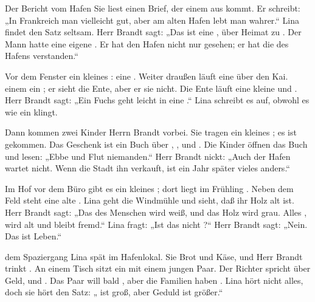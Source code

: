 \documentclass[12pt]{nextbook}
\begin{document}
\begin{readersection}{Der Bericht vom Hafen}
Sie liest einen Brief, der  einem  aus  kommt. Er schreibt: „In Frankreich  man vielleicht gut, aber am alten Hafen lebt man wahrer.“ Lina findet den Satz seltsam. Herr Brandt sagt: „Das ist eine , über Heimat zu . Der Mann hatte eine eigene . Er hat den Hafen nicht nur gesehen; er hat die  des Hafens verstanden.“

Vor dem Fenster  ein kleines : eine . Weiter draußen läuft eine  über den Kai.  einem   ein ; er sieht die Ente, aber er  sie nicht. Die Ente läuft  eine kleine  und . Herr Brandt sagt: „Ein Fuchs geht  leicht in eine .“ Lina schreibt es auf, obwohl es wie ein  klingt.

Dann kommen zwei Kinder  Herrn Brandt vorbei. Sie tragen ein kleines ; es ist  gekommen. Das Geschenk ist ein Buch über , ,  und . Die Kinder öffnen das Buch und lesen: „Ebbe und Flut  niemanden.“ Herr Brandt nickt: „Auch der Hafen wartet nicht. Wenn die Stadt ihn verkauft, ist ein Jahr später vieles anders.“

Im Hof vor dem Büro gibt es ein kleines ; dort liegt im Frühling . Neben dem Feld steht eine alte . Lina geht  die Windmühle und sieht, daß ihr Holz alt ist. Herr Brandt sagt: „Das  des Menschen wird weiß, und das Holz wird grau. Alles , wird alt und bleibt  fremd.“ Lina fragt: „Ist das nicht ?“ Herr Brandt sagt: „Nein. Das ist Leben.“

 dem Spaziergang  Lina spät im Hafenlokal. Sie  Brot und Käse, und Herr Brandt trinkt . An einem Tisch sitzt ein  mit einem jungen Paar. Der Richter spricht über Geld,  und . Das Paar will bald , aber die Familien haben . Lina hört nicht alles, doch sie hört den Satz: „ ist groß, aber Geduld ist größer.“


\end{readersection}
\end{document}
